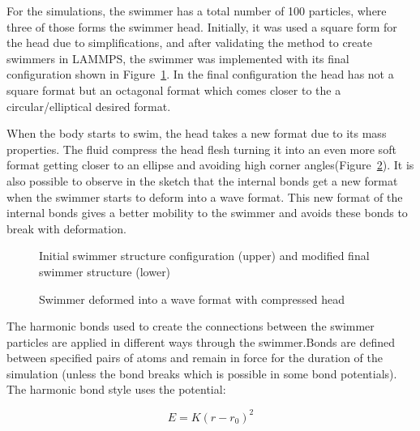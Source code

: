 For the simulations, the swimmer has a total number of 100 particles, where three of those forms the swimmer head. Initially, it was used a square form for the head due to
simplifications, and after validating the method to create swimmers in LAMMPS, the swimmer was implemented with its final configuration shown in Figure~\ref{fig:Bild2.5}.
In the final configuration the head has not a square format but an octagonal format which comes closer to the a circular/elliptical desired format.\par 
When the body starts to swim, the head takes a new format due to its mass properties. The fluid compress the head flesh turning it into an even more soft format getting closer to an 
ellipse and avoiding high corner angles(Figure~\ref{fig:Bild4}). It is also possible to observe in the sketch that the internal bonds get a new format when the swimmer starts to
deform into a wave format. This new format of the internal bonds gives a better mobility to the swimmer and avoids these bonds to break with deformation.  \par

\begin{figure}[ht]
\centering
  \begin{footnotesize}
  
  \caption[Initial swimmer structure configuration (upper) and modified final swimmer structure (lower)]{Initial swimmer structure configuration (upper) and modified final swimmer structure (lower)}
  \label{fig:Bild2.5}
  \end{footnotesize}
\end{figure} 

\begin{figure}[ht]
\centering
  \begin{footnotesize} 
  
  \caption[Swimmer deformed into a wave format with compressed head]{Swimmer deformed into a wave format with compressed head}
  \label{fig:Bild4}
  \end{footnotesize}
\end{figure} 

The harmonic bonds used to create the connections between the swimmer particles are applied in different ways through the swimmer.Bonds are defined between specified pairs of 
atoms and remain in force for the duration of the simulation (unless the bond breaks which is possible in some bond potentials). The harmonic bond style uses the potential:


\begin{equation} 
  E = K ( r - r_{0})^2
\end{equation}


